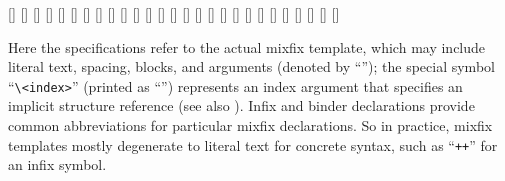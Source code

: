 \begin{isabellebody}
\begin{isamarkuptext}
  \begin{railoutput}
[]
\rail@bar
{}[]
[]
[]
\rail@endbar
{}[]
[]
[]
\rail@end
{}
\rail@bar
{}[]
[]
[]
\rail@bar
{}
[]
\rail@endbar
\rail@bar
{}
[]
\rail@endbar
{}[]
[]
[]
[]
\rail@bar
{}
[]
\rail@endbar
{}[]
[]
\rail@endbar
\rail@end
{}
\rail@bar
{}[]
[]
[]
[]
\rail@endbar
\rail@end
{}
[]
\rail@plus
{}[]
[]
\rail@endplus
{}[]
\rail@end
\end{railoutput}


  Here the \hyperlink{syntax.string}{\mbox{}} specifications refer to the actual mixfix
  template, which may include literal text, spacing, blocks, and
  arguments (denoted by ``''); the special symbol
  ``\verb|\<index>|'' (printed as ``'') represents an index
  argument that specifies an implicit structure reference (see also
  ).  Infix and binder declarations provide common
  abbreviations for particular mixfix declarations.  So in practice,
  mixfix templates mostly degenerate to literal text for concrete
  syntax, such as ``\verb|++|'' for an infix symbol.


\end{isamarkuptext}
\end{isabellebody}
